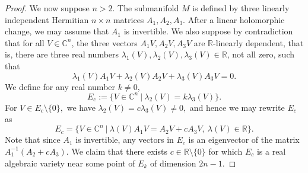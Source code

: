 \documentclass[12pt]{amsart}
\newcommand{\C}{\mathbb C}
\newcommand{\R}{\mathbb R}
\theoremstyle{remark}
\theoremstyle{example}
\theoremstyle{definition}
\numberwithin{equation}{section}
\begin{document}
\begin{proof}
We now suppose $n>2$. The submanifold $M$ is defined by three linearly independent Hermitian $n\times n$ matrices $A_1,A_2,A_3$. 
After a linear holomorphic change, we may assume that $A_1$ is  invertible.  We also suppose by 
contradiction that for all $V\in \C^n$, the three vectors $A_1V,A_2V,A_3V$ are $\R$-linearly dependent, that is, there are three real numbers $\lambda_1(V),\lambda_2(V),\lambda_3(V) \in \R$, not all zero, such that 
\begin{equation}\label{tutu}\lambda_1(V)A_1V+\lambda_2(V)A_2V+\lambda_3(V)A_3V=0.
\end{equation}
We define for any real number $k\neq 0$, 
$$E_c:=\{ V\in \C^n \ | \ \lambda_2(V) =k \lambda_3(V)\}.$$  
For $V  \in E_c \setminus\{0\},$ we have  $\lambda_2(V) =c  \lambda_3(V) \ne 0,$ and hence we may rewrite $E_c$ as 
$$E_c=\{ V\in \C^n \ | \ \lambda(V) A_1V=A_2V+cA_3V, \ \lambda(V) \in \R \}.$$
Note that since  $A_1$ is invertible, any vectors in $E_c$ is an eigenvector of the matrix $A_1^{-1}(A_2+cA_3)$.   
We claim that  there exists $c \in \R\setminus \{0\}$ for which $ E_c$  is  a real  algebraic variety  near some point of $E_k$ of dimension $2n-1$.  


\end{proof}
\end{document}
